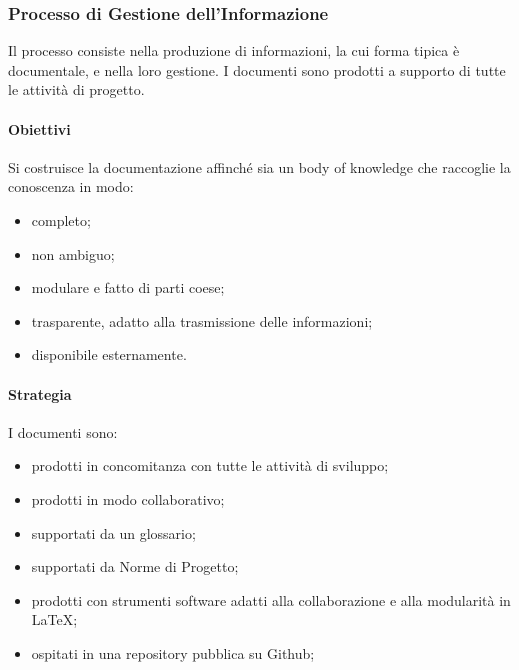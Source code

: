 	\subsubsection{Processo di Gestione dell'Informazione}
	Il processo consiste nella produzione di informazioni, la cui forma tipica è  documentale, e nella loro gestione. I documenti sono prodotti a supporto di tutte le attività di progetto.
		\paragraph{Obiettivi}
			Si costruisce la documentazione affinché sia un body of knowledge %
			che raccoglie la conoscenza in modo:
			\begin{itemize}
				\item completo;
				\item non ambiguo;
				\item modulare e fatto di parti coese;
				\item trasparente, adatto alla trasmissione delle informazioni;
				\item disponibile esternamente.
			\end{itemize}
		\paragraph{Strategia}
		I documenti sono:
		\begin{itemize}
			\item prodotti in concomitanza con tutte le attività di sviluppo;
			\item prodotti in modo collaborativo;
			\item supportati da un glossario;
			\item supportati da Norme di Progetto;
			\item prodotti con strumenti software adatti alla collaborazione e alla modularità in \LaTeX{};
			\item ospitati in una repository pubblica su Github;
		\end{itemize}
